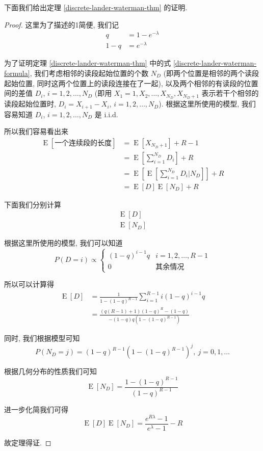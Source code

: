 下面我们给出定理 \ref{discrete-lander-waterman-thm} 的证明. 

\begin{proof}
这里为了描述的1简便, 我们记
\begin{align*}
q &= 1 - e^{-\lambda} \\
1-q &= e^{-\lambda}
\end{align*}

为了证明定理 \ref{discrete-lander-waterman-thm} 
中的式 \eqref{discrete-lander-waterman-formula}, 
我们考虑相邻的读段起始位置的个数 $N_D$ (即两个位置是相邻的两个读段起始位置, 
同时这两个位置上的读段连接在了一起), 
以及两个相邻的有读段的位置间的差值 $D_i$, $i=1,2,\ldots,N_D$ 
(即用 $X_1=1,X_2,\ldots,X_{N_D}, X_{N_D+1}$ 表示若干个相邻的读段起始位置时, 
$D_i=X_{i+1}-X_i$, $i=1,2,\ldots,N_D$). 
根据这里所使用的模型, 我们容易知道 $D_i$, $i=1,2,\ldots,N_D$ 是 i.i.d. 

所以我们容易看出来
\begin{align*}
\operatorname{E}[\text{一个连续段的长度}] &= \operatorname{E}[X_{N_D + 1}] +R-1 \\
&= \operatorname{E}[\sum_{i=1}^{N_D} D_i] +R \\
&= \operatorname{E}[\operatorname{E}[\sum_{i=1}^{N_D} D_i|N_D]] +R \\
&= \operatorname{E}[D] \operatorname{E}[N_D] +R
\end{align*}

下面我们分别计算
\begin{align*}
\operatorname{E}[D] \\
\operatorname{E}[N_D]
\end{align*}

根据这里所使用的模型, 我们可以知道
\[
P(D=i) \propto \begin{cases}
(1-q)^{i-1} q & i=1,2,\ldots,R-1 \\
0 & \text{其余情况}
\end{cases}
\]

所以可以计算得
\begin{align*}
\operatorname{E}[D] &= \frac{1}{1-(1-q)^{R-1}} \sum_{i=1}^{R-1} i (1-q)^{i-1} q \\
&= \frac{(q(R-1)+1)(1-q)^R-(1-q)}{-(1-q)q(1-(1-q)^{R-1})}
\end{align*}

同时, 我们根据模型可知
\[
P(N_D=j) = (1-q)^{R-1}(1-(1-q)^{R-1})^{j},\ j=0,1,\ldots
\]

根据几何分布的性质我们可知
\[
\operatorname{E}[N_D]=\frac{1-(1-q)^{R-1}}{(1-q)^{R-1}}
\]

进一步化简我们可得
\[
\operatorname{E}[D] \operatorname{E}[N_D] = \frac{e^{R\lambda} -1}{e^{\lambda}-1} -R
\]

故定理得证. 

\end{proof}

